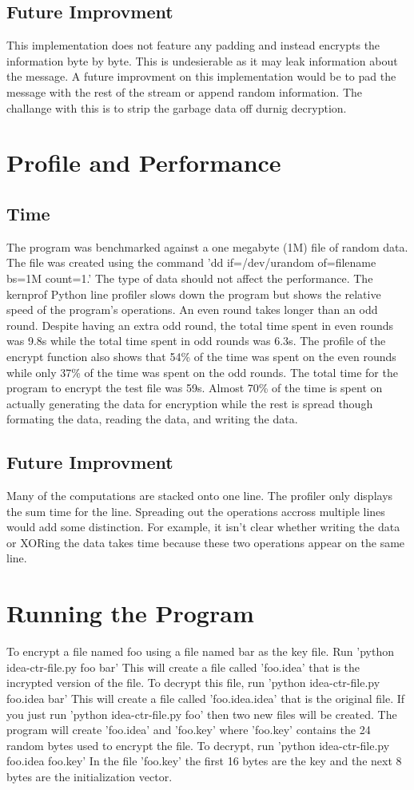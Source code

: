 \documentclass[12pt]{article}
\begin{document}
\subsection{Future Improvment}
This implementation does not feature any padding and instead encrypts the information byte by byte. This is undesierable as it may leak information about the message. A future improvment on this implementation would be to pad the message with the rest of the stream or append random information. The challange with this is to strip the garbage data off durnig decryption.
\section{Profile and Performance}
\subsection{Time}
The program was benchmarked against a one megabyte (1M) file of random data. The file was created using the command 'dd if=/dev/urandom of=filename bs=1M count=1.' The type of data should not affect the performance. The kernprof Python line profiler slows down the program but shows the relative speed of the program's operations. An even round takes longer than an odd round. Despite having an extra odd round, the total time spent in even rounds was 9.8s while the total time spent in odd rounds was 6.3s. The profile of the encrypt function also shows that 54\% of the time was spent on the even rounds while only 37\% of the time was spent on the odd rounds. The total time for the program to encrypt the test file was 59s. Almost 70\% of the time is spent on actually generating the data for encryption while the rest is spread though formating the data, reading the data, and writing the data.
\subsection{Future Improvment}
Many of the computations are stacked onto one line. The profiler only displays the sum time for the line. Spreading out the operations accross multiple lines would add some distinction. For example, it isn't clear whether writing the data or XORing the data takes time because these two operations appear on the same line.
\section{Running the Program}
To encrypt a file named foo using a file named bar as the key file. Run 'python idea-ctr-file.py foo bar' This will create a file called 'foo.idea' that is the incrypted version of the file. To decrypt this file, run 'python idea-ctr-file.py foo.idea bar' This will create a file called 'foo.idea.idea' that is the original file. If you just run 'python idea-ctr-file.py foo' then two new files will be created. The program will create 'foo.idea' and 'foo.key' where 'foo.key' contains the 24 random bytes used to encrypt the file. To decrypt, run 'python idea-ctr-file.py foo.idea foo.key' In the file 'foo.key' the first 16 bytes are the key and the next 8 bytes are the initialization vector.
\end{document}
